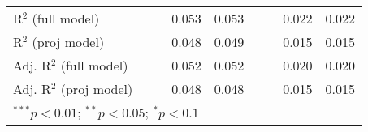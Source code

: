 \begin{sidewaystable}[h]
\begin{center}
{\begin{tabular}{l S[table-format=6.6] S[table-format=6.6] S[table-format=6.6] S[table-format=6.6] S[table-format=5.5] S[table-format=5.6] S[table-format=5.6] S[table-format=5.6]}
R$^2$ (full model)                  &              &              & 0.053        & 0.053        &             &              & 0.022        & 0.022        \\
R$^2$ (proj model)                  &              &              & 0.048        & 0.049        &             &              & 0.015        & 0.015        \\
Adj. R$^2$ (full model)             &              &              & 0.052        & 0.052        &             &              & 0.020        & 0.020        \\
Adj. R$^2$ (proj model)             &              &              & 0.048        & 0.048        &             &              & 0.015        & 0.015        \\
\bottomrule
{}
\end{tabular}}
\label{table:coefficients}
\end{center}
\end{sidewaystable}
